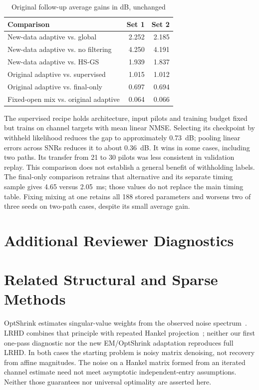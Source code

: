 \documentclass[journal]{IEEEtran}
\begin{document}
\begin{table}[!t]
\caption{Original follow-up average gains in dB, unchanged}
\centering\small
\begin{tabular}{@{}p{}rr@{}}\toprule
Comparison & Set 1 & Set 2\\\midrule
New-data adaptive vs. global & 2.252 & 2.185\\
New-data adaptive vs. no filtering & 4.250 & 4.191\\
New-data adaptive vs. HS-GS & 1.939 & 1.837\\
Original adaptive vs. supervised & 1.015 & 1.012\\
Original adaptive vs. final-only & 0.697 & 0.694\\
Fixed-open mix vs. original adaptive & 0.064 & 0.066\\\bottomrule
\end{tabular}
\end{table}
The supervised recipe holds architecture, input pilots and training
budget fixed but trains on channel targets with mean linear NMSE.
Selecting its checkpoint by withheld likelihood reduces the gap to
approximately 0.73~dB; pooling linear errors across SNRs reduces it to
about 0.36~dB. It wins in some cases, including two paths. Its transfer
from 21 to 30 pilots was less consistent in validation replay. This
comparison does not establish a general benefit of withholding labels.
The final-only comparison retrains that alternative and its separate
timing sample gives 4.65 versus 2.05~ms; those values do not replace the
main timing table. Fixing mixing at one retains all 188 stored parameters
and worsens two of three seeds on two-path cases, despite its small
average gain.

\section{Additional Reviewer Diagnostics}






\section{Related Structural and Sparse Methods}
OptShrink estimates singular-value weights from the observed noise
spectrum~\cite{nadakuditi2014}. LRHD combines that principle with
repeated Hankel projection~\cite{yin2021}; neither our first one-pass
diagnostic nor the new EM/OptShrink adaptation reproduces full LRHD. In both
cases the starting problem is noisy matrix denoising, not recovery from
affine magnitudes. The noise on a Hankel matrix formed from an iterated
channel estimate need not meet asymptotic independent-entry assumptions.
Neither those guarantees nor universal optimality are asserted here.
\end{document}
